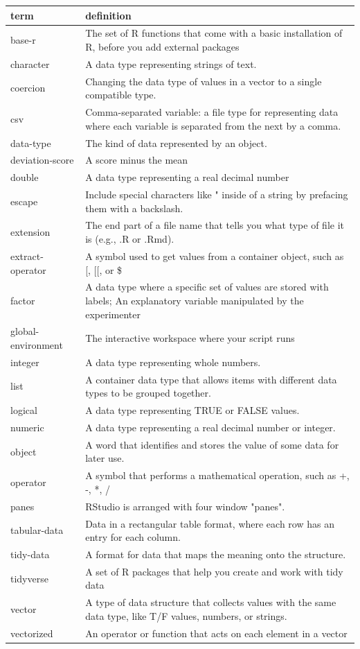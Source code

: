 \documentclass[
  oneside]{book}
\begin{document}
\begin{tabular}{l|l}
\hline
term & definition\\
\hline
base-r & The set of R functions that come with a basic installation of R, before you add external packages\\
\hline
character & A data type representing strings of text.\\
\hline
coercion & Changing the data type of values in a vector to a single compatible type.\\
\hline
csv & Comma-separated variable: a file type for representing data where each variable is separated from the next by a comma.\\
\hline
data-type & The kind of data represented by an object.\\
\hline
deviation-score & A score minus the mean\\
\hline
double & A data type representing a real decimal number\\
\hline
escape & Include special characters like " inside of a string by prefacing them with a backslash.\\
\hline
extension & The end part of a file name that tells you what type of file it is (e.g., .R or .Rmd).\\
\hline
extract-operator & A symbol used to get values from a container object, such as [, [[, or \$\\
\hline
factor & A data type where a specific set of values are stored with labels; An explanatory variable manipulated by the experimenter\\
\hline
global-environment & The interactive workspace where your script runs\\
\hline
integer & A data type representing whole numbers.\\
\hline
list & A container data type that allows items with different data types to be grouped together.\\
\hline
logical & A data type representing TRUE or FALSE values.\\
\hline
numeric & A data type representing a real decimal number or integer.\\
\hline
object & A word that identifies and stores the value of some data for later use.\\
\hline
operator & A symbol that performs a mathematical operation, such as +, -, *, /\\
\hline
panes & RStudio is arranged with four window "panes".\\
\hline
tabular-data & Data in a rectangular table format, where each row has an entry for each column.\\
\hline
tidy-data & A format for data that maps the meaning onto the structure.\\
\hline
tidyverse & A set of R packages that help you create and work with tidy data\\
\hline
vector & A type of data structure that collects values with the same data type, like T/F values, numbers, or strings.\\
\hline
vectorized & An operator or function that acts on each element in a vector\\
\hline
\end{tabular}
\end{document}
